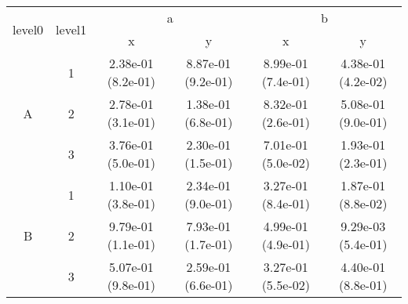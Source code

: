 \begin{tabular}{cccccc}
\toprule
\multirow{2}{*}{level0} & \multirow{2}{*}{level1}&\multicolumn{2}{c}{a}&\multicolumn{2}{c}{b}\tabularnewline
\cmidrule(lr){3-4}
\cmidrule(lr){5-6}
&&x&y&x&y\tabularnewline
\midrule
\multirow{3}{*}{A}&1& 2.38e-01 (8.2e-01)& 8.87e-01 (9.2e-01)& 8.99e-01 (7.4e-01)& 4.38e-01 (4.2e-02)\tabularnewline
&2& 2.78e-01 (3.1e-01)& 1.38e-01 (6.8e-01)& 8.32e-01 (2.6e-01)& 5.08e-01 (9.0e-01)\tabularnewline
&3& 3.76e-01 (5.0e-01)& 2.30e-01 (1.5e-01)& 7.01e-01 (5.0e-02)& 1.93e-01 (2.3e-01)\tabularnewline
\midrule
\multirow{3}{*}{B}&1& 1.10e-01 (3.8e-01)& 2.34e-01 (9.0e-01)& 3.27e-01 (8.4e-01)& 1.87e-01 (8.8e-02)\tabularnewline
&2& 9.79e-01 (1.1e-01)& 7.93e-01 (1.7e-01)& 4.99e-01 (4.9e-01)& 9.29e-03 (5.4e-01)\tabularnewline
&3& 5.07e-01 (9.8e-01)& 2.59e-01 (6.6e-01)& 3.27e-01 (5.5e-02)& 4.40e-01 (8.8e-01)\tabularnewline
\bottomrule
\end{tabular}
